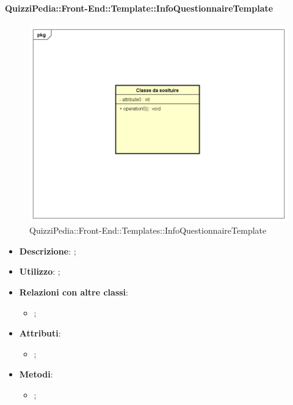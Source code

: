 		\paragraph{QuizziPedia::Front-End::Template::InfoQuestionnaireTemplate}
		
		\label{QuizziPedia::Front-End::Templates::InfoQuestionnaireTemplate}

		\begin{figure}[h]
			\centering
			\includegraphics[scale=0.5,keepaspectratio]{UML/Classi/Front-End/Temporanea.png}
			\caption{QuizziPedia::Front-End::Templates::InfoQuestionnaireTemplate}
		\end{figure}
		
		\begin{itemize}
			\item \textbf{Descrizione}: ;
			\item \textbf{Utilizzo}: ;
			\item \textbf{Relazioni con altre classi}: 
			\begin{itemize}
				\item ;
			\end{itemize}
			\item \textbf{Attributi}: 
			\begin{itemize}
				\item ;
			\end{itemize}
			\item \textbf{Metodi}: 
			\begin{itemize}
				\item ;
			\end{itemize}
		\end{itemize}
																					